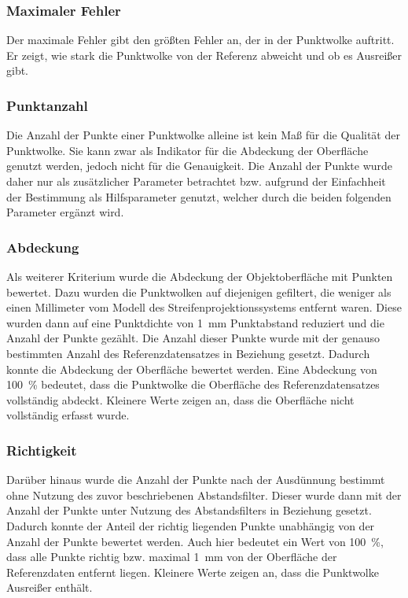 \documentclass[./00PhotoBox.tex]{subfiles}
\begin{document}
\subsubsection{Maximaler Fehler}

Der maximale Fehler gibt den größten Fehler an, der in der Punktwolke auftritt. Er zeigt, wie stark die Punktwolke von der Referenz abweicht und ob es Ausreißer gibt.


\subsubsection{Punktanzahl}
Die Anzahl der Punkte einer Punktwolke alleine ist kein Maß für die Qualität der Punktwolke. Sie kann zwar als Indikator für die Abdeckung der Oberfläche genutzt werden, jedoch nicht für die Genauigkeit. Die Anzahl der Punkte wurde daher nur als zusätzlicher Parameter betrachtet bzw. aufgrund der Einfachheit der Bestimmung als Hilfsparameter genutzt, welcher durch die beiden folgenden Parameter ergänzt wird.

\subsubsection{Abdeckung}
Als weiterer Kriterium wurde die Abdeckung der Objektoberfläche mit Punkten bewertet. Dazu wurden die Punktwolken auf diejenigen gefiltert, die weniger als einen Millimeter vom Modell des Streifenprojektionssystems entfernt waren. Diese wurden dann auf eine Punktdichte von \SI{1}{\milli\metre} Punktabstand reduziert und die Anzahl der Punkte gezählt. Die Anzahl dieser Punkte wurde mit der genauso bestimmten Anzahl des Referenzdatensatzes in Beziehung gesetzt. Dadurch konnte die Abdeckung der Oberfläche bewertet werden. Eine Abdeckung von \SI{100}{\percent} bedeutet, dass die Punktwolke die Oberfläche des Referenzdatensatzes vollständig abdeckt. Kleinere Werte zeigen an, dass die Oberfläche nicht vollständig erfasst wurde.

\subsubsection{Richtigkeit}
Darüber hinaus wurde die Anzahl der Punkte nach der Ausdünnung bestimmt ohne Nutzung des zuvor beschriebenen Abstandsfilter. Dieser wurde dann mit der Anzahl der Punkte unter Nutzung des Abstandsfilters in Beziehung gesetzt. Dadurch konnte der Anteil der richtig liegenden Punkte unabhängig von der Anzahl der Punkte bewertet werden. Auch hier bedeutet ein Wert von \SI{100}{\percent}, dass alle Punkte richtig bzw. maximal \SI{1}{\milli\metre} von der Oberfläche der Referenzdaten entfernt liegen. Kleinere Werte zeigen an, dass die Punktwolke Ausreißer enthält.
\end{document}

